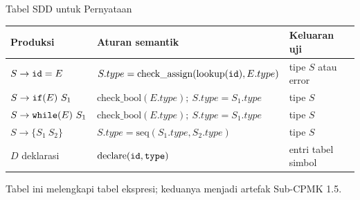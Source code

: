 \documentclass[aspectratio=169,10pt,t]{beamer}
\begin{document}
\begin{frame}{Tabel SDD untuk Pernyataan}
  \scriptsize
  \setlength{\tabcolsep}{4pt}
  \begin{tabular}{@{}p{3.4cm}p{6.2cm}p{3.6cm}@{}}
    \toprule
    \textbf{Produksi} & \textbf{Aturan semantik} &
      \textbf{Keluaran uji} \\
    \midrule
    \(S \to \texttt{id}=E\) &
      \(S.type=\text{check\_assign}(\text{lookup}(\texttt{id}),E.type)\) &
      tipe \(S\) atau error \\
    \(S \to \texttt{if}(E)\ S_1\) &
      \(\text{check\_bool}(E.type);\ S.type=S_1.type\) & tipe \(S\) \\
    \(S \to \texttt{while}(E)\ S_1\) &
      \(\text{check\_bool}(E.type);\ S.type=S_1.type\) & tipe \(S\) \\
    \(S \to \{S_1\ S_2\}\) &
      \(S.type=\text{seq}(S_1.type,S_2.type)\) & tipe \(S\) \\
    \(D\) deklarasi &
      \(\text{declare}(\texttt{id},\texttt{type})\) & entri tabel simbol \\
    \bottomrule
  \end{tabular}

  \vspace{5pt}
  {\scriptsize\color{ubbblue!75}Tabel ini melengkapi tabel ekspresi;
  keduanya menjadi artefak Sub-CPMK 1.5.}
\end{frame}
\end{document}
